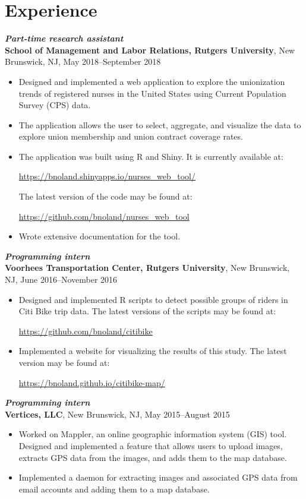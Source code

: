 \documentclass[letterpaper,12pt]{article}
\begin{document}
\section*{Experience}
\textit{\textbf{Part-time research assistant}} \\
\textbf{School of Management and Labor Relations, Rutgers University}, New Brunswick, NJ, May 
2018--September 2018
\begin{itemize}
\item
Designed and implemented a web application to explore the unionization trends of registered 
nurses in the United States using Current Population Survey (CPS) data.
\item
The application allows the user to select, aggregate, and visualize the data to explore union 
membership and union contract coverage rates.
\item
The application was built using R and Shiny. It is currently available at:
\begin{center}
\url{https://bnoland.shinyapps.io/nurses_web_tool/}
\end{center}
The latest version of the code may be found at:
\begin{center}
\url{https://github.com/bnoland/nurses_web_tool}
\end{center}
\item
Wrote extensive documentation for the tool.
\end{itemize}

\textit{\textbf{Programming intern}} \\
\textbf{Voorhees Transportation Center, Rutgers University}, New Brunswick, NJ, June 2016--November 
2016
\begin{itemize}
\item
Designed and implemented R scripts to detect possible groups of riders in Citi Bike trip data. The 
latest versions of the scripts may be found at:
\begin{center}
\url{https://github.com/bnoland/citibike}
\end{center}

\item
Implemented a website for visualizing the results of this study. The latest version may be found at:
\begin{center}
\url{https://bnoland.github.io/citibike-map/}
\end{center}

\end{itemize}

\textit{\textbf{Programming intern}} \\
\textbf{Vertices, LLC}, New Brunswick, NJ, May 2015--August 2015
\begin{itemize}
\item
Worked on Mappler, an online geographic information system (GIS) tool. Designed and implemented a 
feature that allows users to upload images, extracts GPS data from the images, and adds them to the 
map database.
\item
Implemented a daemon for extracting images and associated GPS data from email accounts and adding 
them to a map database.
\end{itemize}
\end{document}
